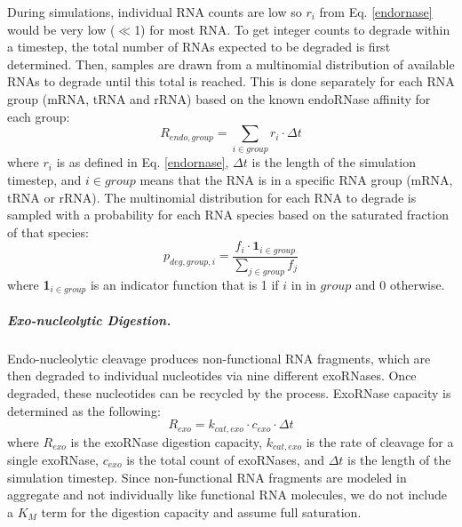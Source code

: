 \documentclass[12pt]{article}
\begin{document}
During simulations, individual RNA counts are low so $r_i$ from Eq. \ref{endornase} would be very low ($\ll$1) for most RNA. To get integer counts to degrade within a timestep, the total number of RNAs expected to be degraded is first determined. Then, samples are drawn from a multinomial distribution of available RNAs to degrade until this total is reached.  This is done separately for each RNA group (mRNA, tRNA and rRNA) based on the known endoRNase affinity for each group:
\begin{equation}
    R_{endo,group} = \sum\limits_{i \in group} r_i \cdot \Delta t
\end{equation}
\noindent where $r_i$ is as defined in Eq. \ref{endornase}, $\Delta t$ is the length of the simulation timestep, and $i \in group$ means that the RNA is in a specific RNA group (mRNA, tRNA or rRNA). The multinomial distribution for each RNA to degrade is sampled with a probability for each RNA species based on the saturated fraction of that species:
\begin{equation}
    p_{deg, group, i} = \frac{f_i \cdot \textbf{1}_{i\in group}}{\sum\limits_{j \in group} f_j}
\end{equation}
\noindent where \textbf{1}$_{i\in group}$ is an indicator function that is 1 if $i$ in in $group$ and 0 otherwise.

\subparagraph{Exo-nucleolytic Digestion.}
Endo-nucleolytic cleavage produces non-functional RNA fragments, which are then degraded to individual nucleotides via nine different exoRNases. Once degraded, these nucleotides can be recycled by the  process.  ExoRNase capacity is determined as the following:
\begin{equation}
    R_{exo} = k_{cat,exo} \cdot c_{exo} \cdot \Delta t
\end{equation}
\noindent where $R_{exo}$ is the exoRNase digestion capacity, $k_{cat,exo}$ is the rate of cleavage for a single exoRNase, $c_{exo}$ is the total count of exoRNases, and $\Delta t$ is the length of the simulation timestep. Since non-functional RNA fragments are modeled in aggregate and not individually like functional RNA molecules, we do not include a $K_M$ term for the digestion capacity and assume full saturation.
\end{document}
